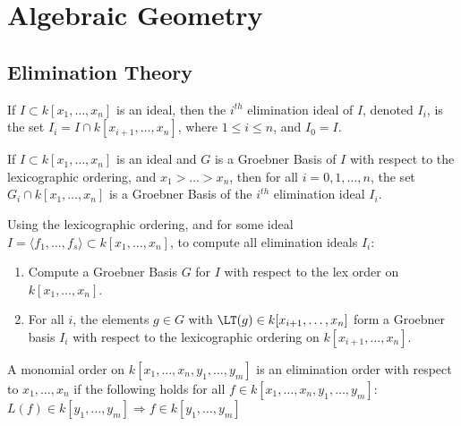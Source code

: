 \documentclass[crop=false,class=article,oneside]{standalone}
\begin{document}
    \ifx\ifmathcoursesalgebraicgeometry\undefined
        \section*{Algebraic Geometry}
        \setcounter{section}{1}
    \fi
    \subsection{Elimination Theory}
        \begin{definition}
            If $I\subset{k}[x_1,\hdots,x_{n}]$ is an ideal,
            then the $i^{th}$ elimination ideal of $I$,
            denoted $I_{i}$, is the set
            $I_{i}=I\cap{k}[x_{i+1},\hdots,x_{n}]$,
            where $1\leq{i}\leq{n}$, and $I_{0}=I$.
        \end{definition}
        \begin{theorem}
            If $I\subset k[x_1,\hdots ,x_n]$ is an ideal and
            $G$ is a Groebner Basis of $I$ with respect to the
            lexicographic ordering, and $x_1>\hdots > x_n$, then
            for all $i=0,1,\hdots,n$, the set
            $G_{i}\cap{k}[x_1,\hdots,x_n]$ is a Groebner Basis of
            the $i^{th}$ elimination ideal $I_{i}$.
        \end{theorem}
        \begin{remark}
            Using the lexicographic ordering, and for some ideal
            $I=\langle{f_{1}},\hdots,f_{s}\rangle%
               \subset{k}[x_1,\hdots ,x_n]$,
            to compute all elimination ideals $I_{i}$:
            \begin{enumerate}
                \item Compute a Groebner Basis $G$ for $I$ with
                      respect to the lex order on $k[x_1,\hdots,x_n]$.
                \item For all $i$, the elements $g\in G$ with
                      $\LT(g)\in{k}[x_{i+1},\hdots,x_{n}]$ form a
                      Groebner basis $I_{i}$ with respect to
                      the lexicographic ordering on
                      $k[x_{i+1},\hdots,x_n]$.
            \end{enumerate}
        \end{remark}
        \begin{definition}
            A monomial order on
            $k[x_{1},\hdots,x_{n},y_{1},\hdots,y_{m}]$
            is an elimination order with respect to
            $x_{1},\hdots,x_{n}$ if the following holds for
            all $f\in{k}[x_{1},\hdots,x_{n},y_{1},\hdots,y_{m}]$:
            $L(f)\in{k}[y_{1},\hdots,y_{m}]%
             \Rightarrow{f}\in{k}[y_{1},\hdots,y_{m}]$
        \end{definition}
\end{document}
